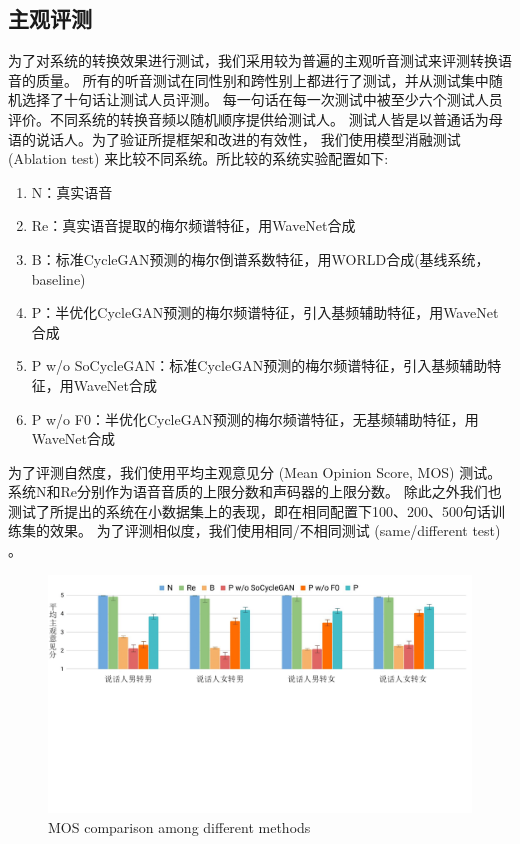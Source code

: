 \subsection{主观评测}
为了对系统的转换效果进行测试，我们采用较为普遍的主观听音测试来评测转换语音的质量。
所有的听音测试在同性别和跨性别上都进行了测试，并从测试集中随机选择了十句话让测试人员评测。
每一句话在每一次测试中被至少六个测试人员评价。不同系统的转换音频以随机顺序提供给测试人。
测试人皆是以普通话为母语的说话人。为了验证所提框架和改进的有效性，
我们使用模型消融测试 (Ablation test) 来比较不同系统。所比较的系统实验配置如下:

\begin{enumerate}
    \item N：真实语音
    \item Re：真实语音提取的梅尔频谱特征，用WaveNet合成
    \item B：标准CycleGAN预测的梅尔倒谱系数特征，用WORLD合成(基线系统，baseline)
    \item P：半优化CycleGAN预测的梅尔频谱特征，引入基频辅助特征，用WaveNet合成
    \item P w/o SoCycleGAN：标准CycleGAN预测的梅尔频谱特征，引入基频辅助特征，用WaveNet合成
    \item P w/o F0：半优化CycleGAN预测的梅尔频谱特征，无基频辅助特征，用WaveNet合成
\end{enumerate}

为了评测自然度，我们使用平均主观意见分 (Mean Opinion Score, MOS) 测试。
系统N和Re分别作为语音音质的上限分数和声码器的上限分数。
除此之外我们也测试了所提出的系统在小数据集上的表现，即在相同配置下100、200、500句话训练集的效果。
为了评测相似度，我们使用相同/不相同测试 (same/different test) 。

\begin{figure}[!htp]
    \centering
    \includegraphics[width=13cm,trim=0 290 0 0,clip]{figure/4_mos.png}
    {MOS comparison among different methods}
    \label{fig:mos}
\end{figure}

